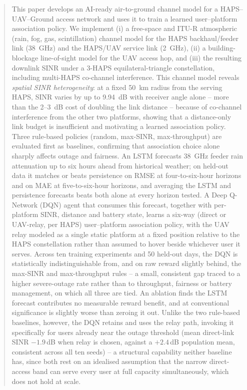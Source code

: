 \documentclass[]{ieeeaccess}
\begin{document}
\begin{abstract}
This paper develops an AI-ready air-to-ground channel model for a HAPS--UAV--Ground access network and uses it to train a learned user--platform association policy. We implement (i) a free-space and ITU-R atmospheric (rain, fog, gas, scintillation) channel model for the HAPS backhaul/feeder link (38~GHz) and the HAPS/UAV service link (2~GHz), (ii) a building-blockage line-of-sight model for the UAV access hop, and (iii) the resulting downlink SINR under a 3-HAPS equilateral-triangle constellation, including multi-HAPS co-channel interference. This channel model reveals \emph{spatial SINR heterogeneity}: at a fixed 50~km radius from the serving HAPS, SINR varies by up to 9.94~dB with receiver angle alone -- more than the 2--3~dB cost of doubling the link distance -- because of co-channel interference from the other two platforms, showing that a distance-only link budget is insufficient and motivating a learned association policy. Three rule-based policies (random, max-SINR, max-throughput) are evaluated first as baselines, confirming that association choice alone sharply affects outage and fairness. An LSTM forecasts 38~GHz feeder rain attenuation up to six hours ahead from historical weather; on held-out data it matches or beats persistence on RMSE at four-to-six-hour horizons and on MAE at five-to-six-hour horizons, and averaging the LSTM and persistence forecasts beats both alone at every horizon tested. A Deep Q-Network (DQN) agent that consumes this forecast, together with per-platform SINR, distance and battery state, learns a six-way (direct or UAV-relay, per HAPS) user--platform association policy, with the UAV relay modeled as a single static platform at a fixed position relative to the HAPS constellation rather than assumed to hover beside whichever user it serves. Across ten training experiments and 50 held-out days, the DQN is statistically indistinguishable from, and on raw reward slightly behind, the max-SINR and max-throughput rules -- a small, consistent gap traced to a higher severe-outage rate rather than to throughput, fairness or battery management, on which all three are tied. An ablation finds the LSTM forecast contributes no measurable reward benefit, and at conventional significance is slightly worse than zeroing it out. Unlike the two rule-based baselines, however, the DQN retains and uses the relay path, invoking it specifically for users already near the outage threshold (mean direct-link SINR $-1.9$\,dB when relay is chosen, against a $+2.4$\,dB population mean, consistent across all ten seeds) -- a structural capability neither baseline has, since both rest on an idealised assumption that the narrow direct-access band can serve every user at full capacity simultaneously, which does not hold at scale.
\end{abstract}
\end{document}
